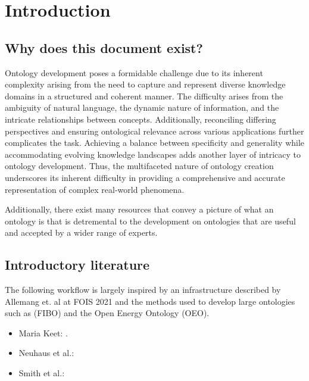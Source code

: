 \section{Introduction}

\subsection{Why does this document exist?}

Ontology development poses a formidable challenge due to its inherent complexity arising from the need to capture and represent diverse knowledge domains in a structured and coherent manner. The difficulty arises from the ambiguity of natural language, the dynamic nature of information, and the intricate relationships between concepts. Additionally, reconciling differing perspectives and ensuring ontological relevance across various applications further complicates the task. Achieving a balance between specificity and generality while accommodating evolving knowledge landscapes adds another layer of intricacy to ontology development. Thus, the multifaceted nature of ontology creation underscores its inherent difficulty in providing a comprehensive and accurate representation of complex real-world phenomena.

Additionally, there exist many resources that convey a picture of what an ontology is that is detremental to the development on ontologies that are useful and accepted by a wider range of experts. 

\subsection{Introductory literature}

The following workflow is largely inspired by an infrastructure described by Allemang et. al at FOIS 2021\cite{kendall-workflow} and the methods used to develop large ontologies such as (FIBO) \cite{fibo2013} and the Open Energy Ontology (OEO)\cite{oeo2021}.

\begin{itemize}
    \item Maria Keet: \cite{keet2018introduction}.
    \item Neuhaus et al.: \cite{Neuhaus2022OntologyDI}
    \item Smith et al.: \cite{bfo-book}
\end{itemize}

